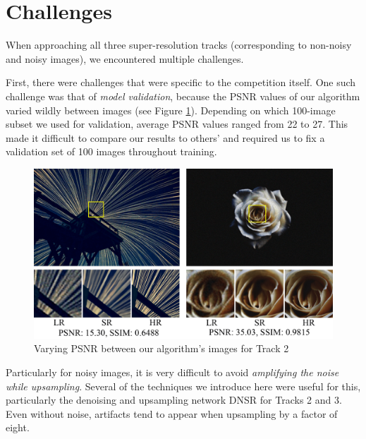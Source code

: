 \documentclass[10pt,twocolumn,letterpaper]{article}
\begin{document}




\section{Challenges}
When approaching all three super-resolution tracks (corresponding to non-noisy and noisy images), we encountered multiple challenges.

First, there were challenges that were specific to the competition itself. One such challenge was that of \textit{model validation}, because the PSNR values of our algorithm varied wildly between images (see Figure \ref{fig:varyingpsnr}). Depending on which 100-image subset we used for validation, average PSNR values ranged from 22 to 27. This made it difficult to compare our results to others' and required us to fix a validation set of 100 images throughout training.

\begin{figure}[ht!]
    \centering
    \includegraphics[width=\columnwidth]{Images/PSNR.png}
    \caption{Varying PSNR between our algorithm's images for Track 2}
    \label{fig:varyingpsnr}
\end{figure}

Particularly for noisy images, it is very difficult to avoid \textit{amplifying the noise while upsampling}. Several of the techniques we introduce here were useful for this, particularly the denoising and upsampling network DNSR for Tracks 2 and 3. Even without noise, artifacts tend to appear when upsampling by a factor of eight.
\end{document}
